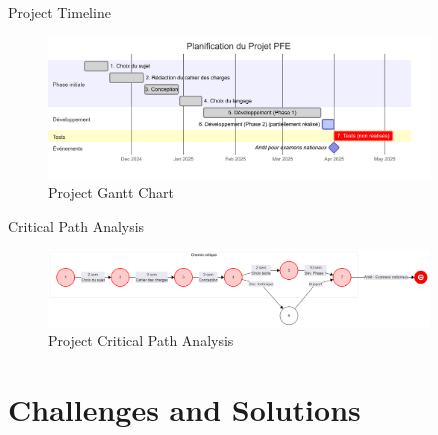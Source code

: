 \documentclass[aspectratio=169]{beamer}
\begin{document}
\begin{frame}{Project Timeline}
    \begin{figure}
        \includegraphics[width=0.9\textwidth,height=0.7\textheight,keepaspectratio]{../pfe-pics/diagrames/Mermaid Chart - Create complex, visual diagrams with text. A smarter way of creating diagrams.-2025-06-10-203842.png}
        \caption{Project Gantt Chart}
    \end{figure}
\end{frame}

\begin{frame}{Critical Path Analysis}
    \begin{figure}
        \includegraphics[width=0.9\textwidth,height=0.7\textheight,keepaspectratio]{../pfe-pics/diagrames/Mermaid Chart - Create complex, visual diagrams with text. A smarter way of creating diagrams.-2025-06-10-203658.png}
        \caption{Project Critical Path Analysis}
    \end{figure}
\end{frame}

\section{Challenges and Solutions}
\end{document}
